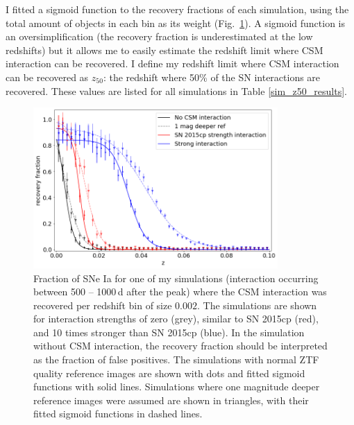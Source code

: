 \documentclass[a4paper,oneside,12pt, class=Latex/Classes/PhDthesisPSnPDF, crop=false]{standalone}
\begin{document}
I fitted a sigmoid function to the recovery fractions of each simulation, using the total amount of objects in each bin as its weight (Fig.~\ref{recov_fracs}). A sigmoid function is an oversimplification (the recovery fraction is underestimated at the low redshifts) but it allows me to easily estimate the redshift limit where CSM interaction can be recovered. I define my redshift limit where CSM interaction can be recovered as $z_{50}$: the redshift where 50\% of the SN interactions are recovered. These values are listed for all simulations in Table \ref{sim_z50_results}.

\begin{figure}
 \centering
 \includegraphics[width=0.831\textwidth]{../Images/chapter_3/recov_fracs.png}
 \caption{Fraction of SNe Ia for one of my simulations (interaction occurring between 500 -- 1000\,d after the peak) where the CSM interaction was recovered per redshift bin of size $0.002$. The simulations are shown for interaction strengths of zero (grey), similar to SN 2015cp (red), and 10 times stronger than SN 2015cp (blue). In the simulation without CSM interaction, the recovery fraction should be interpreted as the fraction of false positives. The simulations with normal ZTF quality reference images are shown with dots and fitted sigmoid functions with solid lines. Simulations where one magnitude deeper reference images were assumed are shown in triangles, with their fitted sigmoid functions in dashed lines.}
 \label{recov_fracs}
\end{figure}
\end{document}
